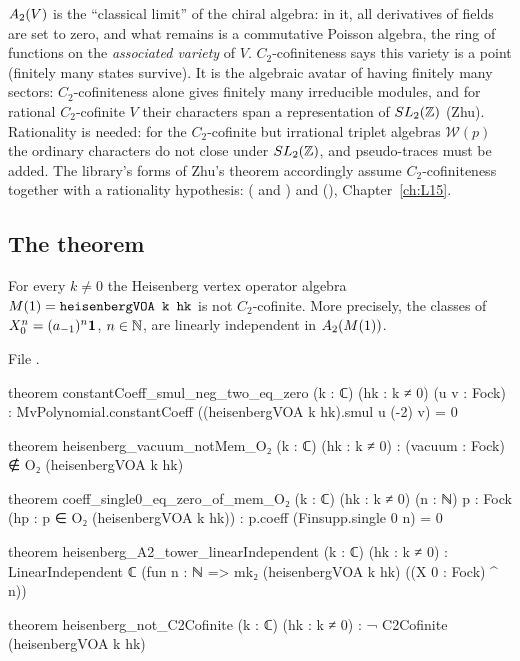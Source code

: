 \begin{physics}
$A_2(V)$ is the ``classical limit'' of the chiral algebra: in it, all derivatives of fields are set to
zero, and what remains is a commutative Poisson algebra, the ring of functions on the \emph{associated
variety} of $V$. $C_2$-cofiniteness says this variety is a point (finitely many states survive). It is the
algebraic avatar of having finitely many sectors: $C_2$-cofiniteness alone gives finitely many irreducible
modules, and for rational $C_2$-cofinite $V$ their characters span a representation of $SL_2({\mathbb{Z}})$ (Zhu). Rationality
is needed: for the $C_2$-cofinite but irrational triplet algebras $\mathcal W(p)$ the ordinary characters do not close
under $SL_2({\mathbb{Z}})$, and pseudo-traces must be added. The library's forms of Zhu's theorem accordingly assume
$C_2$-cofiniteness together with a rationality hypothesis: \allowbreak{}\allowbreak{}\allowbreak{}
( and ) and  (),
Chapter~\ref{ch:L15}.
\end{physics}

\subsection{The theorem}

\begin{theorem}\label{l05:thm:notC2}
For every $k\ne0$ the Heisenberg vertex operator algebra $M(1)=\lean{heisenbergVOA k hk}$ is not
$C_2$-cofinite. More precisely, the classes of $X_0^n=(a_{-1})^n\mathbf{1}$, $n\in{\mathbb{N}}$, are linearly independent
in $A_2(M(1))$.
\end{theorem}

\noindent File .
\begin{leancode}
theorem constantCoeff_smul_neg_two_eq_zero (k : ℂ) (hk : k ≠ 0) (u v : Fock) :
    MvPolynomial.constantCoeff ((heisenbergVOA k hk).smul u (-2) v) = 0

theorem heisenberg_vacuum_notMem_O₂ (k : ℂ) (hk : k ≠ 0) :
    (vacuum : Fock) ∉ O₂ (heisenbergVOA k hk)

theorem coeff_single0_eq_zero_of_mem_O₂ (k : ℂ) (hk : k ≠ 0) (n : ℕ) {p : Fock}
    (hp : p ∈ O₂ (heisenbergVOA k hk)) :
    p.coeff (Finsupp.single 0 n) = 0

theorem heisenberg_A2_tower_linearIndependent (k : ℂ) (hk : k ≠ 0) :
    LinearIndependent ℂ (fun n : ℕ => mk₂ (heisenbergVOA k hk) ((X 0 : Fock) ^ n))

theorem heisenberg_not_C2Cofinite (k : ℂ) (hk : k ≠ 0) :
    ¬ C2Cofinite (heisenbergVOA k hk)
\end{leancode}


